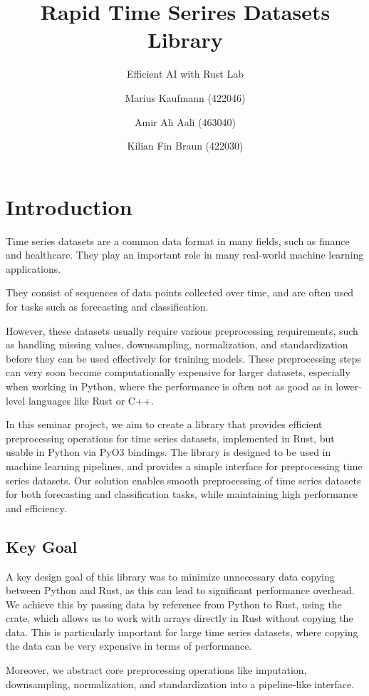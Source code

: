 \documentclass[review]{AIM_report}
\title{Rapid Time Serires Datasets Library}
\subtitle{Efficient AI with Rust Lab}
\author{Marius Kaufmann (422046) \and Amir Ali Aali (463040) \and Kilian Fin Braun (422030)}
\institute{RWTH Aachen University, Germany\\
\email{$\{$amir.ali.aali, marius.kaufmann$\}$@rwth-aachen.de}}
\begin{document}
\maketitle

\tableofcontents
\newpage

\section{Introduction}
Time series datasets are a common data format in many fields, such as finance and healthcare. They play an important role in many real-world machine learning applications.

They consist of sequences of data points collected over time, and are often used for tasks such as forecasting and classification.

However, these datasets usually require various preprocessing requirements, such as handling missing values, downsampling, normalization, and standardization before they can be used effectively for training models. These preprocessing steps can very soon become computationally expensive for larger datasets, especially when working in Python, where the performance is often not as good as in lower-level languages like Rust or C++.

In this seminar project, we aim to create a library that provides efficient preprocessing operations for time series datasets, implemented in Rust, but usable in Python via PyO3 bindings. The library is designed to be used in machine learning pipelines, and provides a simple interface for preprocessing time series datasets. Our solution enables smooth preprocessing of time series datasets for both forecasting and classification tasks, while maintaining high performance and efficiency.

\subsection{Key Goal}
A key design goal of this library was to minimize unnecessary data copying between Python and Rust, as this can lead to significant performance overhead. We achieve this by passing data by reference from Python to Rust, using the \numpy crate, which allows us to work with \numpy arrays directly in Rust without copying the data. This is particularly important for large time series datasets, where copying the data can be very expensive in terms of performance.

Moreover, we abstract core preprocessing operations like imputation, downsampling, normalization, and standardization into a pipeline-like interface.
\end{document}

